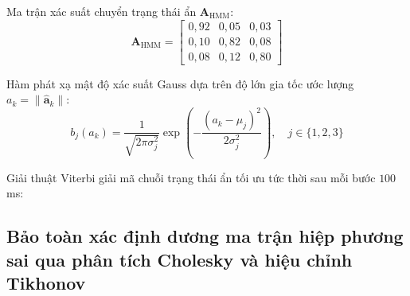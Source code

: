 Ma trận xác suất chuyển trạng thái ẩn $\mathbf{A}_{\text{HMM}}$:
\begin{equation}
\mathbf{A}_{\text{HMM}} = \begin{bmatrix}
0{,}92 & 0{,}05 & 0{,}03 \\
0{,}10 & 0{,}82 & 0{,}08 \\
0{,}08 & 0{,}12 & 0{,}80
\end{bmatrix}
\label{eq:hmm-transition-matrix-formula}
\end{equation}

Hàm phát xạ mật độ xác suất Gauss dựa trên độ lớn gia tốc ước lượng $a_k = \|\hat{\mathbf{a}}_k\|$:
\begin{equation}
b_j(a_k) = \frac{1}{\sqrt{2\pi \sigma_j^2}} \exp\left( -\frac{(a_k - \mu_j)^2}{2\sigma_j^2} \right), \quad j \in \{1, 2, 3\}
\label{eq:hmm-emission-probability-formula}
\end{equation}

Giải thuật Viterbi giải mã chuỗi trạng thái ẩn tối ưu tức thời sau mỗi bước $100$ ms:

\begin{table}[H]
\centering
\caption{Độ chính xác nhận diện chế độ cơ động và thời gian đáp ứng của giải thuật HMM}
\label{tab:hmm-maneuver-classification-results}
\end{table}

\subsection{Bảo toàn xác định dương ma trận hiệp phương sai qua phân tích Cholesky và hiệu chỉnh Tikhonov}

